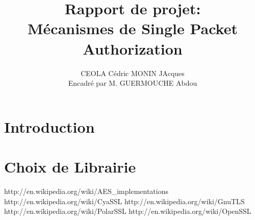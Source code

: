 \documentclass[12pt]{article}
\title{Rapport de projet:\\
Mécanismes de Single Packet Authorization}
\author{CEOLA Cédric MONIN JAcques\\
Encadré par M. GUERMOUCHE Abdou}
\begin{document}
\maketitle

\clearpage                  
\tableofcontents
\clearpage

\section{Introduction}

\section{Choix de Librairie}
http://en.wikipedia.org/wiki/AES_implementations
http://en.wikipedia.org/wiki/CyaSSL
http://en.wikipedia.org/wiki/GnuTLS
http://en.wikipedia.org/wiki/PolarSSL
http://en.wikipedia.org/wiki/OpenSSL
\end{document}
